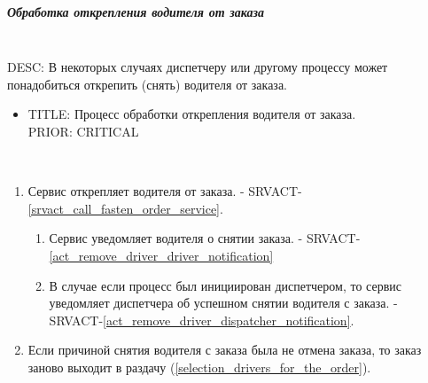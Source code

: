 \subparagraph{Обработка открепления водителя от заказа} \label{remove_driver_from_order} \mbox{}\\

  DESC: В некоторых случаях диспетчеру или другому процессу может понадобиться открепить (снять) водителя от заказа. 

  \begin{itemize}

   \item {
      TITLE: Процесс обработки открепления водителя от заказа.
      \\
      PRIOR: CRITICAL\\
   }

   \end{itemize}


    	\begin{alg}  \label{remove_driver_from_order_alg} \mbox{}\\

        \begin{enumerate}

          \item Сервис открепляет водителя от заказа. - SRVACT-\ref{srvact_call_fasten_order_service}.

          \begin{enumerate}

            \item Сервис уведомляет водителя о снятии заказа. - SRVACT-\ref{act_remove_driver_driver_notification} 
            
            \item В случае если процесс был инициирован диспетчером, то сервис уведомляет диспетчера об успешном снятии водителя с заказа. -  SRVACT-\ref{act_remove_driver_dispatcher_notification}.

          \end{enumerate}
          
          \item Если причиной снятия водителя с заказа была не отмена заказа, то заказ заново выходит в раздачу (\ref{selection_drivers_for_the_order}).

        \end{enumerate}
      \end{alg}